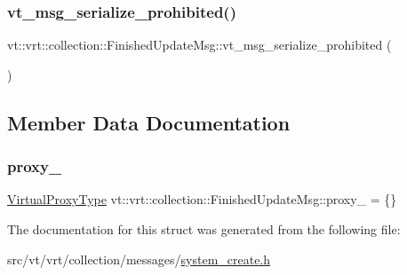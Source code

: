 \subsubsection{\texorpdfstring{vt\+\_\+msg\+\_\+serialize\+\_\+prohibited()}{vt\_msg\_serialize\_prohibited()}}
{\footnotesize\ttfamily vt\+::vrt\+::collection\+::\+Finished\+Update\+Msg\+::vt\+\_\+msg\+\_\+serialize\+\_\+prohibited (\begin{DoxyParamCaption}{ }\end{DoxyParamCaption})}



\subsection{Member Data Documentation}
\mbox{\label{structvt_1_1vrt_1_1collection_1_1_finished_update_msg_a1058ef4d7be406b0cfa0eb768f7ec242}} 
\subsubsection{\texorpdfstring{proxy\+\_\+}{proxy\_}}
{\footnotesize\ttfamily \hyperlink{namespacevt_a1b417dd5d684f045bb58a0ede70045ac}{Virtual\+Proxy\+Type} vt\+::vrt\+::collection\+::\+Finished\+Update\+Msg\+::proxy\+\_\+ = \{\}}



The documentation for this struct was generated from the following file\+:\begin{DoxyCompactItemize}
\item 
src/vt/vrt/collection/messages/\hyperlink{system__create_8h}{system\+\_\+create.\+h}\end{DoxyCompactItemize}
